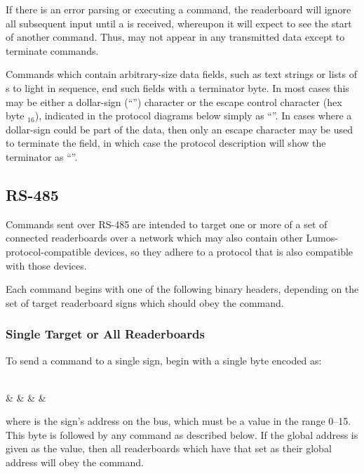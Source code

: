 If there is an error parsing or executing a command, the readerboard will ignore
all subsequent input until a  is received, whereupon it will
expect to see the start of another command. Thus,  may not
appear in any transmitted data except to terminate commands.

Commands which contain arbitrary-size data fields, such as text strings or lists of
s to light in sequence, end such fields with a terminator byte. In most cases
this may be
either a dollar-sign (``\z{\$}'') character or the
escape control character (hex byte $_{16}$), indicated in the protocol diagrams below
simply as ``\z{\$}''. In cases where a dollar-sign could be part of the data, then
only an escape character may be used to terminate the field, in which case the protocol
description will show the terminator as ``''.
\subsection{RS-485}
Commands sent over RS-485 are intended to target one or more of a set of
connected readerboards over a network which may also contain other Lumos-protocol-compatible
devices, so they adhere to a protocol that is also compatible with those devices.

Each command begins with one of the following binary headers, depending on the
set of target readerboard signs which should obey the command.

\subsubsection{Single Target or All Readerboards}
To send a command to a single sign, begin with a single byte encoded as:
\begin{center}
	\begin{bytefield}[endianness=big]{8}
		 \\
		&
		&
		&
		&
	\end{bytefield}
\end{center}
where  is the sign's address on the bus, which must be a value in the
range 0--15. This byte is followed by any command as described below. 
If the global address  is given as the  value, then all readerboards
which have that set as their global address will obey the command.

